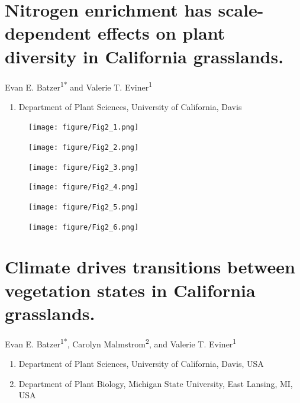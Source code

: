 \documentclass[twoside,12pt,final]{ucthesis-CA2012}
\providecommand{\tightlist}{%
  \setlength{\itemsep}{0pt}\setlength{\parskip}{0pt}}
\begin{document}
\begin{ucmainmatter}
\hypertarget{nitrogen-enrichment-has-scale-dependent-effects-on-plant-diversity-in-california-grasslands.}{%
\chapter{Nitrogen enrichment has scale-dependent effects on plant diversity in California grasslands.}\label{nitrogen-enrichment-has-scale-dependent-effects-on-plant-diversity-in-california-grasslands.}}


Evan E. Batzer\textsuperscript{1*} and Valerie T. Eviner\textsuperscript{1}
\begin{enumerate}
\def\labelenumi{\arabic{enumi}.}
\tightlist
\item
  Department of Plant Sciences, University of California, Davis
\end{enumerate}
\begin{figure}
\centering
\texttt{[image: figure/Fig2\_1.png]}
\caption{\label{fig-2-1}}
\end{figure}
\begin{figure}
\centering
\texttt{[image: figure/Fig2\_2.png]}
\caption{\label{fig-2-2}}
\end{figure}
\begin{figure}
\centering
\texttt{[image: figure/Fig2\_3.png]}
\caption{\label{fig-2-3}}
\end{figure}
\begin{figure}
\centering
\texttt{[image: figure/Fig2\_4.png]}
\caption{\label{fig-2-4}}
\end{figure}
\begin{figure}
\centering
\texttt{[image: figure/Fig2\_5.png]}
\caption{\label{fig-2-5}}
\end{figure}
\begin{figure}
\centering
\texttt{[image: figure/Fig2\_6.png]}
\caption{\label{fig-2-6}}
\end{figure}
\hypertarget{climate-drives-transitions-between-vegetation-states-in-california-grasslands.}{%
\chapter{Climate drives transitions between vegetation states in California grasslands.}\label{climate-drives-transitions-between-vegetation-states-in-california-grasslands.}}


Evan E. Batzer\textsuperscript{1*},
Carolyn Malmstrom\textsuperscript{2},
and Valerie T. Eviner\textsuperscript{1}
\begin{enumerate}
\def\labelenumi{\arabic{enumi}.}
\tightlist
\item
  Department of Plant Sciences, University of California, Davis, USA
\item
  Department of Plant Biology, Michigan State University, East Lansing, MI, USA
\end{enumerate}
\hypertarget{abstract}{%
}
\end{ucmainmatter}
\end{document}
